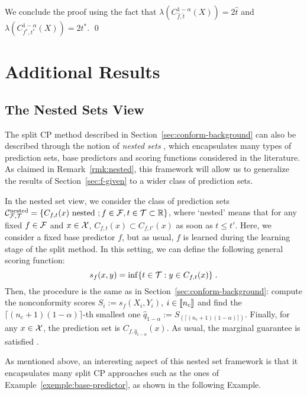      
     
     We conclude the proof using the fact that $\lambda(C_{\hat{f},\hat{t}}^{1-\alpha}(X)) = 2\hat{t}$ and $\lambda(C_{f^*,t ^*}^{1-\alpha}(X)) = 2t^*$. \qed
    

\section{Additional Results}

\subsection{The Nested Sets View}
\label{sec:nested}

The split CP method described in Section~\ref{sec:conform-background} can also be described through the notion of \emph{nested sets} \citep{gupta2022nested}, which encapsulates many types of prediction sets, base predictors and scoring functions considered in the literature. As claimed in Remark~\ref{rmk:nested}, this framework will allow us to generalize the results of Section~\ref{sec:f-given} to a wider class of prediction sets.

In the nested set view, we consider the class of prediction sets ${\cal C}^{\text{nested}}_{\mathcal{F},{\cal T}} = \{C_{f,t}(x) \text{ nested }; f \in \mathcal{F}, t\in{\cal T}\subset{\mathbb{R}}\}$, where `nested' means that for any fixed $f\in\mathcal{F}$ and $x\in{\cal X}$, $C_{f,t}(x)\subset C_{f,t'}(x)$ as soon as $t\leq t'$. Here, we consider a fixed base predictor $f$, but as usual, $f$ is learned during the learning stage of the split method. In this setting, we can define the following general scoring function:
\begin{equation*}
    s_f(x,y) = \inf\{t\in{\cal T} : y\in C_{f,t}(x)\}\;.
\end{equation*}
Then, the procedure is the same as in Section~\ref{sec:conform-background}: compute the nonconformity scores 
$S_i := s_{f}(X_i,Y_i)$, $i \in \llbracket n_c \rrbracket$ and find the $\lceil (n_c+1)(1-\alpha) \rceil$-th smallest one 
$\hat{q}_{1-\alpha}:=S_{(\lceil (n_c+1)(1-\alpha) \rceil)}$. Finally, for any $x\in {\cal X}$, the prediction set is $C_{f,\hat{q}_{1-\alpha}}(x)$. As usual, the marginal guarantee is satisfied \citep[Prop. 1]{gupta2022nested}.

As mentioned above, an interesting aspect of this nested set framework is that it encapsulates many split CP approaches \citep[Table 1]{gupta2022nested} such as the ones of Example~\ref{exemple:base-predictor}, as shown in the following Example. 


